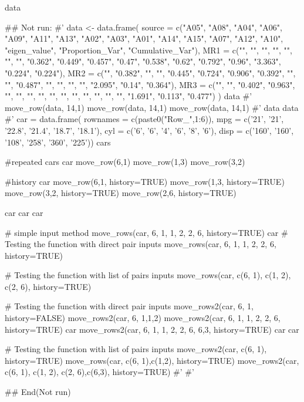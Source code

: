 \documentclass[a4paper]{book}
\begin{document}
%
\begin{Value}
data
\end{Value}
%
\begin{Examples}
\begin{ExampleCode}

## Not run: 
#'
data <- data.frame(
  source = c("A05", "A08", "A04",
  "A06", "A09", "A11", "A13", "A02",
  "A03", "A01", "A14", "A15", "A07",
  "A12", "A10", "eigen_value", "Proportion_Var", "Cumulative_Var"),
  MR1 = c("", "", "", "", "", "", "",
  "0.362", "0.449", "0.457", "0.47",
  "0.538", "0.62", "0.792", "0.96",
  "3.363", "0.224", "0.224"),
  MR2 = c("", "0.382", "", "", "0.445",
  "0.724", "0.906", "0.392", "", "",
  "0.487", "", "", "", "", "2.095", "0.14", "0.364"),
  MR3 = c("", "", "0.402", "0.963", "",
   "", "", "", "", "", "", "", "",
    "", "", "1.691", "0.113", "0.477")
)
data
#'
move_row(data, 14,1)
move_row(data, 14,1)%
move_row(data, 14,1)%
#'
data %
data %
#'
car = data.frame(
  rownames = c(paste0("Row_",1:6)),
  mpg = c('21', '21', '22.8', '21.4', '18.7', '18.1'),
  cyl = c('6', '6', '4', '6', '8', '6'),
  disp = c('160', '160', '108', '258', '360', '225'))
cars

#repeated
cars
car %
  move_row(6,1)%
  move_row(1,3)%
  move_row(3,2)

#history
car %
  move_row(6,1, history=TRUE)%
  move_row(1,3, history=TRUE)%
  move_row(3,2, history=TRUE)%
  move_row(2,6, history=TRUE)

car%
car%
car%

# simple input method
move_rows(car, 6, 1, 1, 2, 2, 6, history=TRUE)
car%
# Testing the function with direct pair inputs
move_rows(car, 6, 1, 1, 2, 2, 6, history=TRUE)

# Testing the function with list of pairs inputs
move_rows(car, c(6, 1), c(1, 2), c(2, 6), history=TRUE)


# Testing the function with direct pair inputs
move_rows2(car, 6, 1,  history=FALSE)
move_rows2(car, 6, 1,1,2)
move_rows2(car, 6, 1, 1, 2, 2, 6, history=TRUE)
car%
move_rows2(car, 6, 1, 1, 2, 2, 6, 6,3, history=TRUE)
car%
car%


# Testing the function with list of pairs inputs
move_rows2(car, c(6, 1), history=TRUE)
move_rows(car, c(6, 1),c(1,2), history=TRUE)
move_rows2(car, c(6, 1), c(1, 2), c(2, 6),c(6,3), history=TRUE)
#'
#'




## End(Not run)

\end{ExampleCode}
\end{Examples}
\end{document}
